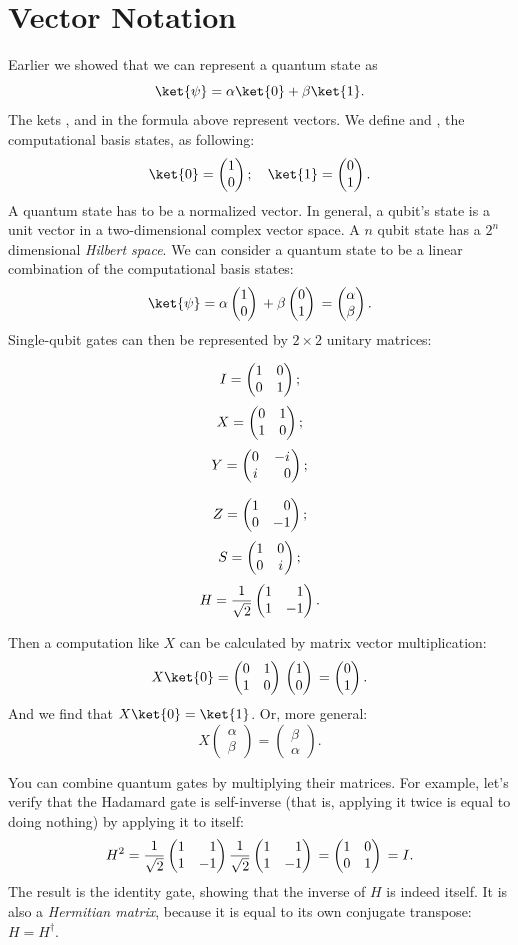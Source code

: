 \section{Vector Notation} \label{sec:matrix_notation}
Earlier we showed that we can represent a quantum state as
\begin{equation}
  \ket{\psi} = \alpha\ket{0} + \beta\ket{1}.
\end{equation}
The kets \ket{\psi},  and  in the formula above represent vectors. We define  and , the computational basis states, as following:
\setlength\multicolsep{0pt}
\begin{equation}
  \ket{0} = \qstatezero{}; \quad \ket{1} = \qstateone{}.
\end{equation}
\noindent
A quantum state has to be a normalized vector. In general, a qubit's state is a unit vector in a two-dimensional complex vector space. A $n$ qubit state has a $2^n$ dimensional \emph{Hilbert space}. We can consider a quantum state to be a linear combination of the computational basis states:
\begin{equation}
  \ket{\psi} = \alpha\qstatezero{} + \beta\qstateone{} = \begin{pmatrix}\alpha \\ \beta\end{pmatrix}.
\end{equation}
Single-qubit gates can then be represented by $2 \times 2$ unitary matrices:
\vspace*{-4mm}
\setlength\multicolsep{0pt}
\begin{multicols}{3}
  \[
    I = \begin{pmatrix} 1 & 0 \\ 0 & 1 \end{pmatrix}{};
  \]
  \vfill
  \[
    X = \begin{pmatrix} 0 & 1 \\ 1 & 0 \end{pmatrix}{};
  \]
  \vfill
  \[
    Y = \ygate{};
  \]
\end{multicols}
\begin{multicols}{3}
  \[
    Z = \zgate{};
  \]
  \vfill
  \[
    S = \begin{pmatrix} 1 & 0 \\ 0 & i \end{pmatrix}{};
  \]
  \vfill
  \[
    H = \hgate{}.
  \]
\end{multicols}
\bigskip
\noindent
Then a computation like $X$ can be calculated by matrix vector multiplication:
\begin{equation}
  X\ket{0} = \xgate{} \qstatezero{} = \qstateone{}.
\end{equation}
And we find that $X\ket{0} = \ket{1}$. Or, more general:
\begin{equation}
  X\begin{pmatrix}\alpha \\ \beta\end{pmatrix} = \begin{pmatrix}\beta \\ \alpha\end{pmatrix}.
\end{equation}

You can combine quantum gates by multiplying their matrices. For example, let's verify that the Hadamard gate is self-inverse (that is, applying it twice is equal to doing nothing) by applying it to itself:
\begin{equation}
  H^2 = \hgate{} \hgate{} = \igate{} = I.
\end{equation}
The result is the identity gate, showing that the inverse of $H$ is indeed itself. It is also a \emph{Hermitian matrix}, because it is equal to its own conjugate transpose: $H = H^\dagger$.
